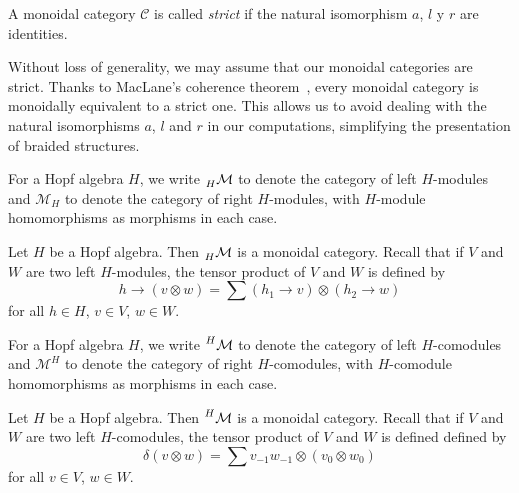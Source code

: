 \documentclass[12pt]{amsproc}
\newcommand{\ydH}{\prescript{H}{H}{\mathcal{YD}}}
\newcommand{\lmod}[1]{\prescript{}{#1}{\mathcal{M}}}
\newcommand{\rmod}[1]{\mathcal{M}_{#1}}
\newcommand{\lcomod}[1]{\prescript{#1}{}{\mathcal{M}}}
\newcommand{\rcomod}[1]{\mathcal{M}^{#1}}
\begin{document}
\begin{definition}
A monoidal category $\mathcal{C}$ is called \emph{strict} if the natural
isomorphism $a$, $l$ y $r$ are identities. 
\end{definition}

Without loss of generality, we may assume that our monoidal categories are strict. Thanks to 
MacLane's coherence theorem~\cite[Theorem XI.5.3]{zbMATH00706259}, every monoidal category is monoidally equivalent to a strict one. This allows us to avoid dealing with the natural isomorphisms $a$, $l$ and $r$ in our computations, simplifying the presentation of braided structures.

For a Hopf algebra $H$, 
we write $\lmod{H}$ to denote the category of 
left $H$-modules and $\rmod{H}$ 
to denote the category of right $H$-modules, with $H$-module 
homomorphisms as morphisms in each case.

\begin{example}
Let $H$ be a Hopf algebra. Then $\lmod{H}$ is a monoidal
category.  Recall that if $V$ and $W$ are two left $H$-modules, the tensor
product of $V$ and $W$ is defined by 
\[
h\rightarrow(v\otimes w)=\sum (h_{1}\rightarrow v)\otimes(h_{2}\rightarrow w)
\]
for all $h\in H$, $v\in V$, $w\in W$. 
\end{example}

For a Hopf algebra $H$, 
we write $\lcomod{H}$ to denote the category of 
left $H$-comodules and $\rcomod{H}$ 
to denote the category of right $H$-comodules, with $H$-comodule 
homomorphisms as morphisms in each case.

\begin{example}
Let $H$ be a Hopf algebra. Then $\lcomod{H}$ is a monoidal
category.  Recall that if $V$ and $W$ are two left $H$-comodules, the tensor
product of $V$ and $W$ is defined defined by 
\[
\delta(v\otimes w)=\sum v_{-1}w_{-1}\otimes(v_0\otimes w_0)
\]
for all $v\in V$, $w\in W$.
\end{example}

\end{document}
